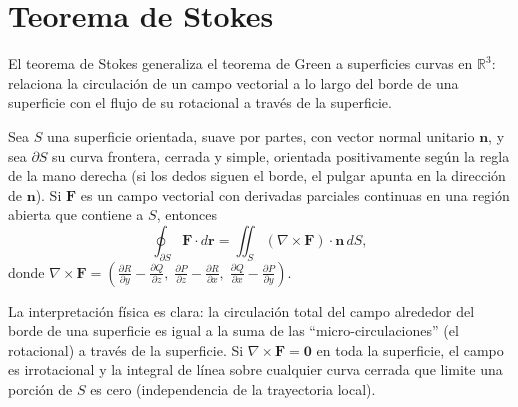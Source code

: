 \section{Teorema de Stokes}

El teorema de Stokes generaliza el teorema de Green a superficies curvas en $\mathbb{R}^3$: relaciona la circulación de un campo vectorial a lo largo del borde de una superficie con el flujo de su rotacional a través de la superficie.

\begin{theorem}
Sea $S$ una superficie orientada, suave por partes, con vector normal unitario $\mathbf{n}$, y sea $\partial S$ su curva frontera, cerrada y simple, orientada positivamente según la regla de la mano derecha (si los dedos siguen el borde, el pulgar apunta en la dirección de $\mathbf{n}$). Si $\mathbf{F}$ es un campo vectorial con derivadas parciales continuas en una región abierta que contiene a $S$, entonces
\[
\oint_{\partial S} \mathbf{F}\cdot d\mathbf{r}
=
\iint_S (\nabla\times\mathbf{F})\cdot\mathbf{n}\,dS,
\]
donde $\displaystyle \nabla\times\mathbf{F} = \left( \frac{\partial R}{\partial y}-\frac{\partial Q}{\partial z},\; \frac{\partial P}{\partial z}-\frac{\partial R}{\partial x},\; \frac{\partial Q}{\partial x}-\frac{\partial P}{\partial y} \right)$.
\end{theorem}

\begin{rem}
La interpretación física es clara: la circulación total del campo alrededor del borde de una superficie es igual a la suma de las ``micro-circulaciones'' (el rotacional) a través de la superficie. Si $\nabla\times\mathbf{F}=\mathbf{0}$ en toda la superficie, el campo es irrotacional y la integral de línea sobre cualquier curva cerrada que limite una porción de $S$ es cero (independencia de la trayectoria local).
\end{rem}

